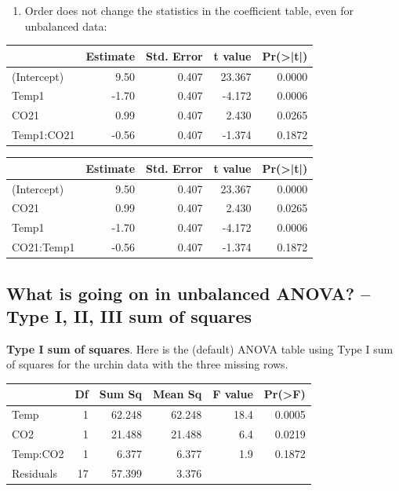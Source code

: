 \documentclass[]{book}
\providecommand{\tightlist}{%
  \setlength{\itemsep}{0pt}\setlength{\parskip}{0pt}}
\begin{document}
\begin{enumerate}
\def\labelenumi{\arabic{enumi}.}
\setcounter{enumi}{2}
\tightlist
\item
  Order does not change the statistics in the coefficient table, even
  for unbalanced data:
\end{enumerate}

\begin{tabular}{l|r|r|r|r}
\hline
  & Estimate & Std. Error & t value & Pr(>|t|)\\
\hline
(Intercept) & 9.50 & 0.407 & 23.367 & 0.0000\\
\hline
Temp1 & -1.70 & 0.407 & -4.172 & 0.0006\\
\hline
CO21 & 0.99 & 0.407 & 2.430 & 0.0265\\
\hline
Temp1:CO21 & -0.56 & 0.407 & -1.374 & 0.1872\\
\hline
\end{tabular}

\begin{tabular}{l|r|r|r|r}
\hline
  & Estimate & Std. Error & t value & Pr(>|t|)\\
\hline
(Intercept) & 9.50 & 0.407 & 23.367 & 0.0000\\
\hline
CO21 & 0.99 & 0.407 & 2.430 & 0.0265\\
\hline
Temp1 & -1.70 & 0.407 & -4.172 & 0.0006\\
\hline
CO21:Temp1 & -0.56 & 0.407 & -1.374 & 0.1872\\
\hline
\end{tabular}

\subsection{What is going on in unbalanced ANOVA? -- Type I, II, III sum
of
squares}\label{what-is-going-on-in-unbalanced-anova-type-i-ii-iii-sum-of-squares}

\textbf{Type I sum of squares}. Here is the (default) ANOVA table using
Type I sum of squares for the urchin data with the three missing rows.

\begin{tabular}{l|r|r|r|r|r}
\hline
  & Df & Sum Sq & Mean Sq & F value & Pr(>F)\\
\hline
Temp & 1 & 62.248 & 62.248 & 18.4 & 0.0005\\
\hline
CO2 & 1 & 21.488 & 21.488 & 6.4 & 0.0219\\
\hline
Temp:CO2 & 1 & 6.377 & 6.377 & 1.9 & 0.1872\\
\hline
Residuals & 17 & 57.399 & 3.376 &  & \\
\hline
\end{tabular}
\end{document}
